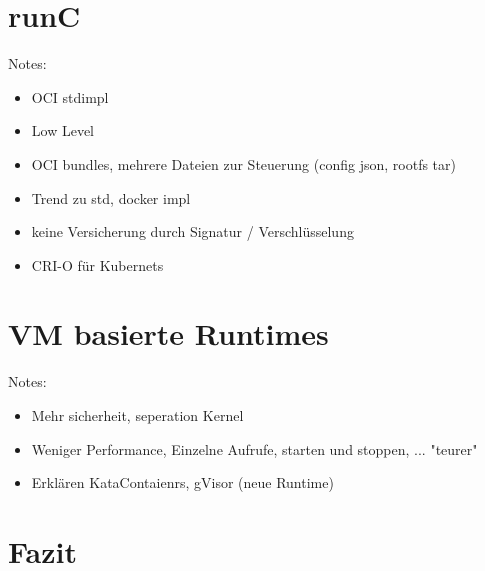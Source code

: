 \section{runC}
\label{sec:compRunc}

Notes:
\begin{itemize}
	\item OCI stdimpl
	\item Low Level
	\item OCI bundles, mehrere Dateien zur Steuerung (config json, rootfs tar)
	\item Trend zu std, docker impl
	\item keine Versicherung durch Signatur / Verschlüsselung
	\item CRI-O für Kubernets
\end{itemize}

\section{VM basierte Runtimes}
\label{sec:compVMbased}

Notes:
\begin{itemize}
	\item Mehr sicherheit, seperation Kernel
	\item Weniger Performance, Einzelne Aufrufe, starten und stoppen, ... "teurer" 
	\item Erklären KataContaienrs, gVisor (neue Runtime)
\end{itemize}


\section{Fazit}
\label{sec:compFazit}